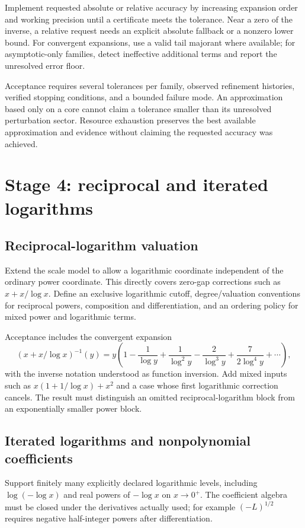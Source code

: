 \documentclass[11pt,a4paper]{article}
\begin{document}
Implement requested absolute or relative accuracy by increasing expansion order and working precision until a certificate meets the tolerance. Near a zero of the inverse, a relative request needs an explicit absolute fallback or a nonzero lower bound. For convergent expansions, use a valid tail majorant where available; for asymptotic-only families, detect ineffective additional terms and report the unresolved error floor.

Acceptance requires several tolerances per family, observed refinement histories, verified stopping conditions, and a bounded failure mode. An approximation based only on a core cannot claim a tolerance smaller than its unresolved perturbation sector. Resource exhaustion preserves the best available approximation and evidence without claiming the requested accuracy was achieved.

\section{Stage 4: reciprocal and iterated logarithms}

\subsection{Reciprocal-logarithm valuation}

Extend the scale model to allow a logarithmic coordinate independent of the ordinary power coordinate. This directly covers zero-gap corrections such as $x+x/\log x$. Define an exclusive logarithmic cutoff, degree/valuation conventions for reciprocal powers, composition and differentiation, and an ordering policy for mixed power and logarithmic terms.

Acceptance includes the convergent expansion
\[
 (x+x/\log x)^{-1}(y)
 =y\left(1-\frac1{\log y}+\frac1{\log^2y}
 -\frac2{\log^3y}+\frac7{2\log^4y}+\cdots\right),
\]
with the inverse notation understood as function inversion. Add mixed inputs such as $x(1+1/\log x)+x^2$ and a case whose first logarithmic correction cancels. The result must distinguish an omitted reciprocal-logarithm block from an exponentially smaller power block.

\subsection{Iterated logarithms and nonpolynomial coefficients}

Support finitely many explicitly declared logarithmic levels, including $\log(-\log x)$ and real powers of $-\log x$ on $x\to0^+$. The coefficient algebra must be closed under the derivatives actually used; for example $(-L)^{1/2}$ requires negative half-integer powers after differentiation.
\end{document}
